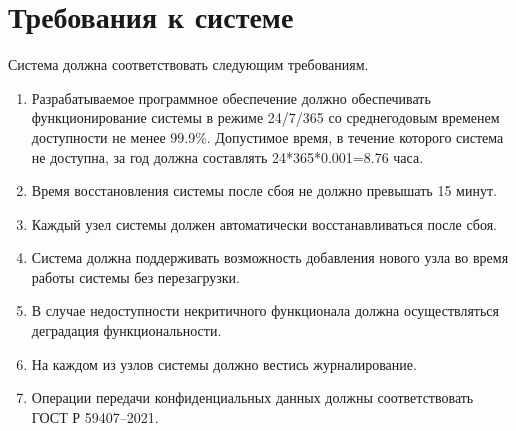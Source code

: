 \section{Требования к системе}
Система должна соответствовать следующим требованиям.
\begin{enumerate}
	\item Разрабатываемое программное обеспечение должно обеспечивать функционирование системы в режиме 24/7/365 со среднегодовым временем доступности не менее 99.9\%. Допустимое время, в течение которого система не доступна, за год должна составлять 24*365*0.001=8.76 часа.
	\item Время восстановления системы после сбоя не должно превышать 15 минут.
	\item Каждый узел системы должен автоматически восстанавливаться после сбоя.
	\item Система должна поддерживать возможность добавления нового узла во время работы системы без перезагрузки.
	\item В случае недоступности некритичного функционала должна осуществляться деградация функциональности.
	\item На каждом из узлов системы должно вестись журналирование.
	\item Операции передачи конфиденциальных данных должны соответствовать ГОСТ Р 59407–2021.
\end{enumerate}